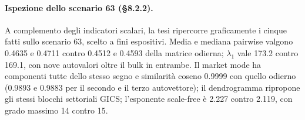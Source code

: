 \paragraph{Ispezione dello scenario 63 (\S8.2.2).}
A complemento degli indicatori scalari, la tesi ripercorre graficamente i cinque fatti sullo scenario 63, scelto a fini espositivi. Media e mediana pairwise valgono 0.4635 e 0.4711 contro 0.4512 e 0.4593 della matrice odierna; $\lambda_1$ vale 173.2 contro 169.1, con nove autovalori oltre il bulk in entrambe. Il market mode ha componenti tutte dello stesso segno e similarità coseno 0.9999 con quello odierno (0.9893 e 0.9883 per il secondo e il terzo autovettore); il dendrogramma ripropone gli stessi blocchi settoriali GICS; l'esponente scale-free è 2.227 contro 2.119, con grado massimo 14 contro 15.
